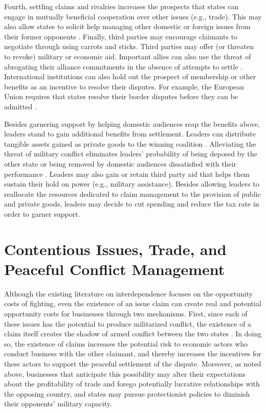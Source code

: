 Fourth, settling claims and rivalries increases the prospects that states can engage in mutually beneficial cooperation over other issues (e.g., trade). This may also allow states to solicit help managing other domestic or foreign issues from their former opponents \citep{fravel2008, goertz2016}. Finally, third parties may encourage claimants to negotiate through using carrots and sticks. Third parties may offer (or threaten to revoke) military or economic aid. Important allies can also use the threat of abrogating their alliance commitments in the absence of attempts to settle \citep{pressman2008}. International institutions can also hold out the prospect of membership or other benefits as an incentive to resolve their disputes. For example, the European Union requires that states resolve their border disputes before they can be admitted \citep{diez2006}.

Besides garnering support by helping domestic audiences reap the benefits above, leaders stand to gain additional benefits from settlement. Leaders can distribute tangible assets gained as private goods to the winning coalition \citep{bdm2003, wright2016}. Alleviating the threat of military conflict eliminates leaders’ probability of being deposed by the other state or being removed by domestic audiences dissatisfied with their performance \citep{bdm2003, chiozza2011}. Leaders may also gain or retain third party aid that helps them sustain their hold on power (e.g., military assistance). Besides allowing leaders to reallocate the resources dedicated to claim management to the provision of public and private goods, leaders may decide to cut spending and reduce the tax rate in order to garner support. 

\section{Contentious Issues, Trade, and Peaceful Conflict Management}


Although the existing literature on interdependence focuses on the opportunity costs of fighting, even the existence of an issue claim can create real and potential opportunity costs for businesses through two mechanisms. First, since each of these issues has the potential to produce militarized conflict, the existence of a claim itself creates the shadow of armed conflict between the two states \citep{lee2012, schultz2015, simmons2005}. In doing so, the existence of claims increases the potential risk to economic actors who conduct business with the other claimant, and thereby increases the incentives for these actors to support the peaceful settlement of the dispute. Moreover, as noted above, businesses that anticipate this possibility may alter their expectations about the profitability of trade and forego potentially lucrative relationships with the opposing country, and states may pursue protectionist policies to diminish their opponents’ military capacity. 

